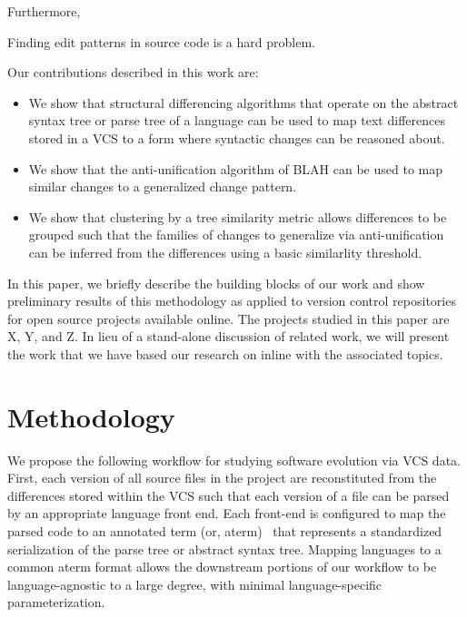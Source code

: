 \documentclass{acm_proc_article-sp}
\newcommand{\claim}[1]{#1}
\begin{document}
Furthermore, 

\claim{Finding edit patterns in source code is a hard problem.}


Our contributions described in this work are:

\begin{itemize}

\item We show that structural differencing algorithms that operate on the abstract
syntax tree or parse tree of a language can be used to map text differences stored in
a VCS to a form where syntactic changes can be reasoned about.

\item We show that the anti-unification algorithm of BLAH can be used to map
similar changes to a generalized change pattern.

\item We show that clustering by a tree similarity metric allows differences to be grouped
such that the families of changes to generalize via anti-unification can be inferred from
the differences using a basic similarlity threshold.

\end{itemize}

In this paper, we briefly describe the building blocks of our work and show preliminary results
of this methodology as applied to version control repositories for open source projects available
online.  The projects studied in this paper are X, Y, and Z.  In lieu of a stand-alone discussion of
related work, we will present the work that we have based our research on inline with the associated
topics.

\section{Methodology}

We propose the following workflow for studying software evolution via VCS
data.  First, each version of all source files in the project are
reconstituted from the differences stored within the VCS such that each
version of a file can be parsed by an appropriate language front end.  Each
front-end is configured to map the parsed code to an annotated term (or,
aterm)~\cite{brand00aterm} that represents a standardized serialization of the parse
tree or abstract syntax tree.  Mapping languages to a common aterm format allows
the downstream portions of our workflow to be language-agnostic to a large degree,
with minimal language-specific parameterization.  
\end{document}
